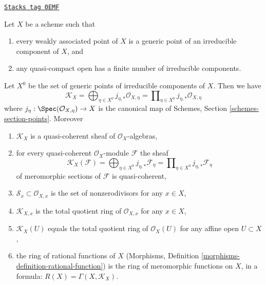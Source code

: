 \begin{lemma}
\label{divisors-lemma-meromorphic-weakass-finite}
\href{https://stacks.math.columbia.edu/tag/0EMF}{\texttt{Stacks tag 0EMF}}

Let $X$ be a scheme such that
\begin{enumerate}
\item[(a)] every weakly associated point of $X$ is a generic point of an
irreducible component of $X$, and
\item[(b)] any quasi-compact open has a finite number of irreducible components.
\end{enumerate}
Let $X^0$ be the set of generic points of irreducible components of $X$.
Then we have
$$
\mathcal{K}_X =
\bigoplus\nolimits_{\eta \in X^0} j_{\eta, *}\mathcal{O}_{X, \eta} =
\prod\nolimits_{\eta \in X^0} j_{\eta, *}\mathcal{O}_{X, \eta}
$$
where $j_\eta : \Spec(\mathcal{O}_{X, \eta}) \to X$ is the canonical map
of Schemes, Section \ref{schemes-section-points}. Moreover
\begin{enumerate}
\item $\mathcal{K}_X$ is a quasi-coherent sheaf of
$\mathcal{O}_X$-algebras,
\item for every quasi-coherent $\mathcal{O}_X$-module $\mathcal{F}$ the sheaf
$$
\mathcal{K}_X(\mathcal{F}) =
\bigoplus\nolimits_{\eta \in X^0} j_{\eta, *}\mathcal{F}_\eta =
\prod\nolimits_{\eta \in X^0} j_{\eta, *}\mathcal{F}_\eta
$$
of meromorphic sections of $\mathcal{F}$
is quasi-coherent,
\item $\mathcal{S}_x \subset \mathcal{O}_{X, x}$
is the set of nonzerodivisors for any $x \in X$,
\item $\mathcal{K}_{X, x}$ is the total quotient ring of $\mathcal{O}_{X, x}$
for any $x \in X$,
\item $\mathcal{K}_X(U)$ equals the total quotient ring of $\mathcal{O}_X(U)$
for any affine open $U \subset X$,
\item the ring of rational functions of $X$
(Morphisms, Definition \ref{morphisms-definition-rational-function})
is the ring of meromorphic
functions on $X$, in a formula: $R(X) = \Gamma(X, \mathcal{K}_X)$.
\end{enumerate}
\end{lemma}

